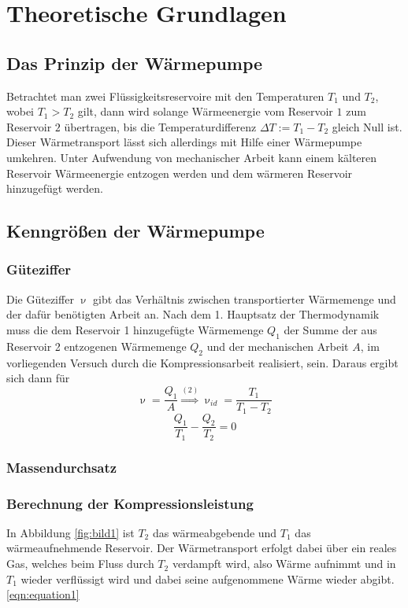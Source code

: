 \section{Theoretische Grundlagen}
\label{sec:Theorie}

\subsection{Das Prinzip der Wärmepumpe}
Betrachtet man zwei Flüssigkeitsreservoire mit den Temperaturen $T_1$ und $T_2$, wobei $T_1 > T_2$ gilt, dann wird solange Wärmeenergie vom Reservoir $1$ zum Reservoir $2$ übertragen, bis die Temperaturdifferenz $\Delta T := T_1 - T_2$ gleich Null ist.
Dieser Wärmetransport lässt sich allerdings mit Hilfe einer Wärmepumpe umkehren. Unter Aufwendung von mechanischer Arbeit kann einem kälteren Reservoir Wärmeenergie entzogen werden und dem wärmeren Reservoir hinzugefügt werden.






\subsection{Kenngrößen der Wärmepumpe}
\subsubsection {Güteziffer}
\label{sec:güteziffer}
Die Güteziffer $\upnu$ gibt das Verhältnis zwischen transportierter Wärmemenge und der dafür benötigten Arbeit an. Nach dem 1. Hauptsatz der Thermodynamik muss die dem Reservoir 1 hinzugefügte Wärmemenge $Q_1$
der Summe der aus Reservoir 2 entzogenen Wärmemenge $Q_2$ und der mechanischen Arbeit $A$, im vorliegenden Versuch durch die Kompressionsarbeit realisiert, sein.
Daraus ergibt sich dann für
\begin{equation}
  \label{eqn:equation1}
  \upnu=\frac{Q_1}{A}\stackrel{(2)}{\Rightarrow} \upnu_{id}=\frac{T_1}{T_1-T_2}
\end{equation}
\begin{equation}
  \frac{Q_1}{T_1}-\frac{Q_2}{T_2}=0\label{eqn:equation2}
\end{equation}
\subsubsection {Massendurchsatz}
\label{sec:massendurchsatz}
\subsubsection {Berechnung der Kompressionsleistung}
\label{sec:kompressorleistung}


In Abbildung \ref{fig:bild1} ist $T_2$ das wärmeabgebende und $T_1$ das wärmeaufnehmende Reservoir. Der Wärmetransport erfolgt dabei über ein reales Gas, welches beim Fluss durch $T_2$ verdampft wird, also Wärme aufnimmt
und in $T_1$ wieder verflüssigt wird und dabei seine aufgenommene Wärme wieder abgibt. \eqref{eqn:equation1}







\cite{Anleitung}
